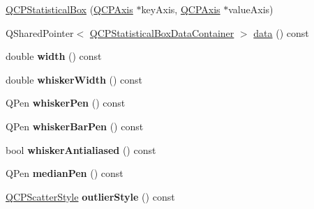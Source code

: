 \begin{DoxyCompactItemize}
\item 
\hyperlink{classQCPStatisticalBox_a75c2b3e7fcd0741cc981693a2ba63b27}{Q\+C\+P\+Statistical\+Box} (\hyperlink{classQCPAxis}{Q\+C\+P\+Axis} $\ast$key\+Axis, \hyperlink{classQCPAxis}{Q\+C\+P\+Axis} $\ast$value\+Axis)
\item 
Q\+Shared\+Pointer$<$ \hyperlink{classQCPDataContainer}{Q\+C\+P\+Statistical\+Box\+Data\+Container} $>$ \hyperlink{classQCPStatisticalBox_a99de828ddad81bb79aaed7db54b87e3f}{data} () const 
\item 
double {\bfseries width} () const \hypertarget{classQCPStatisticalBox_a0733a7bd575fc5929ce6d507bcc2a04c}{}\label{classQCPStatisticalBox_a0733a7bd575fc5929ce6d507bcc2a04c}

\item 
double {\bfseries whisker\+Width} () const \hypertarget{classQCPStatisticalBox_ab02392dd54ebd6dd7c8d6fb5c3f0421c}{}\label{classQCPStatisticalBox_ab02392dd54ebd6dd7c8d6fb5c3f0421c}

\item 
Q\+Pen {\bfseries whisker\+Pen} () const \hypertarget{classQCPStatisticalBox_a26d2b34cbaeac2dd639bb21590f317c4}{}\label{classQCPStatisticalBox_a26d2b34cbaeac2dd639bb21590f317c4}

\item 
Q\+Pen {\bfseries whisker\+Bar\+Pen} () const \hypertarget{classQCPStatisticalBox_ab151a727fb0b6396acb3b6c72505a4fe}{}\label{classQCPStatisticalBox_ab151a727fb0b6396acb3b6c72505a4fe}

\item 
bool {\bfseries whisker\+Antialiased} () const \hypertarget{classQCPStatisticalBox_a1385fb66ed6a1e8edd9128eb7dca73d6}{}\label{classQCPStatisticalBox_a1385fb66ed6a1e8edd9128eb7dca73d6}

\item 
Q\+Pen {\bfseries median\+Pen} () const \hypertarget{classQCPStatisticalBox_a96aa0bb650b83e9dfa0387ca4db7fa05}{}\label{classQCPStatisticalBox_a96aa0bb650b83e9dfa0387ca4db7fa05}

\item 
\hyperlink{classQCPScatterStyle}{Q\+C\+P\+Scatter\+Style} {\bfseries outlier\+Style} () const \hypertarget{classQCPStatisticalBox_ab7e5a68bce97ba43a7ff18e074c4dcad}{}\label{classQCPStatisticalBox_ab7e5a68bce97ba43a7ff18e074c4dcad}


\end{DoxyCompactItemize}
